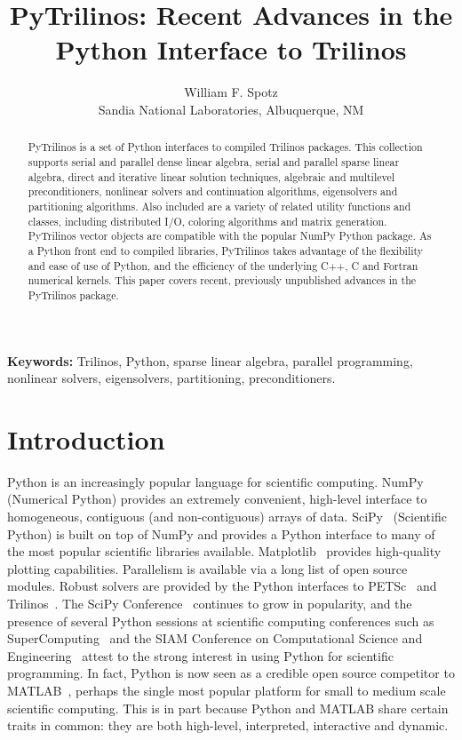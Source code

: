 \documentclass[11pt]{article}
\title{PyTrilinos: Recent Advances in the \\ Python Interface to Trilinos}
\author{William F. Spotz \\ Sandia National Laboratories, Albuquerque, NM}
\begin{document}
\maketitle

\begin{abstract}
PyTrilinos is a set of Python interfaces to compiled Trilinos packages.  This collection supports serial and parallel dense linear algebra, serial and parallel sparse linear algebra, direct and iterative linear solution techniques, algebraic and multilevel preconditioners, nonlinear solvers and continuation algorithms, eigensolvers and partitioning algorithms.  Also included are a variety of related utility functions and classes, including distributed I/O, coloring algorithms and matrix generation.  PyTrilinos vector objects are compatible with the popular NumPy Python package.  As a Python front end to compiled libraries, PyTrilinos takes advantage of the flexibility and ease of use of Python, and the efficiency of the underlying C++, C and Fortran numerical kernels.  This paper covers recent, previously unpublished advances in the PyTrilinos package.
\end{abstract}

{\bf Keywords:} Trilinos, Python, sparse linear algebra, parallel programming, nonlinear solvers, eigensolvers, partitioning, preconditioners.

\section{Introduction}
\label{sec:introduction}

Python is an increasingly popular language for scientific computing.  NumPy~\cite{NumPyGuide} (Numerical Python) provides an extremely convenient, high-level interface to homogeneous, contiguous (and non-contiguous) arrays of data.  SciPy~\cite{SciPyRefGuide} (Scientific Python) is built on top of NumPy and provides a Python interface to many of the most popular scientific libraries available.  Matplotlib~\cite{Matplotlib} provides high-quality plotting capabilities.  Parallelism is available via a long list of open source modules.  Robust solvers are provided by the Python interfaces to PETSc~\cite{PETScUserRef} and Trilinos~\cite{Trilinos}.  The SciPy Conference~\cite{SciPyConference} continues to grow in popularity, and the presence of several Python sessions at scientific computing conferences such as SuperComputing~\cite{SuperComputing} and the SIAM Conference on Computational Science and Engineering~\cite{SIAM_CSE} attest to the strong interest in using Python for scientific programming.  In fact, Python is now seen as a credible open source competitor to MATLAB~\cite{MATLAB}, perhaps the single most popular platform for small to medium scale scientific computing.  This is in part because Python and MATLAB share certain traits in common: they are both high-level, interpreted, interactive and dynamic.
\end{document}
